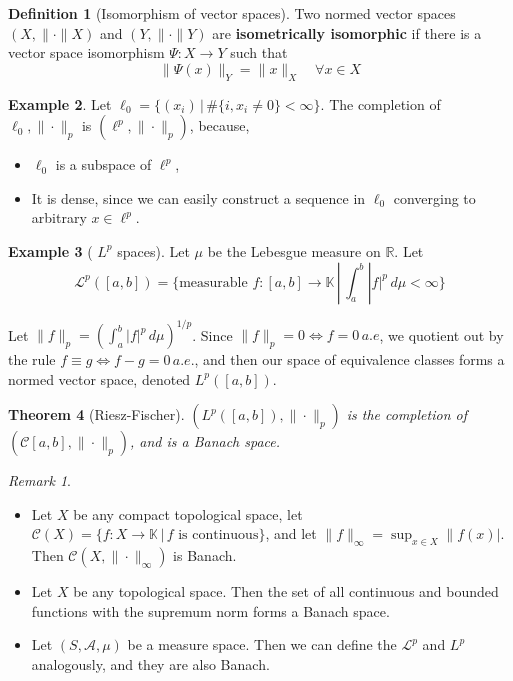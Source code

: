 \documentclass[justified]{tufte-book}
\theoremstyle{plain}%
\newtheorem{thm}{Theorem}[chapter]
\theoremstyle{definition}
\newtheorem{defn}[thm]{Definition}
\newtheorem{exmp}[thm]{Example}
\theoremstyle{remark}
\newtheorem*{rem}{Remark}
\newcommand{\R}{\mathbb{R}}
\newcommand{\K}{\mathbb{K}}
\begin{document}
\begin{defn}[Isomorphism of vector spaces]
  Two normed vector spaces $(X, \| \cdot \|X)$ and $(Y, \| \cdot \|Y)$ are \textbf{isometrically isomorphic} if there is a vector space isomorphism $\Psi: X \rightarrow Y$ such that \[
      \| \Psi(x) \|_Y = \| x \|_X \quad \forall x \in X
  \]
\end{defn}

\begin{exmp}
  Let $\ell_0 = \{ (x_i) \, | \, \# \{ i, x_i \neq 0 \} < \infty \}$.  The completion of $\ell_0, \| \cdot \|_p$ is $(\ell^p, \| \cdot \|_p )$, because,
  \begin{itemize}
      \item $\ell_0$ is a subspace of $\ell^p$,
      \item It is dense, since we can easily construct a sequence in $\ell_0$ converging to arbitrary $x \in \ell^p$.
  \end{itemize}
\end{exmp}
\begin{exmp}[ $L^p$ spaces]
  Let $\mu$ be the Lebesgue measure on $\R$.  Let \[
      \mathcal{L}^p([a,b]) = \{ \text{measurable } f: [a,b] \rightarrow \K \, | \, \int_a^b |f|^p \, d \mu < \infty \}
  \]
  
  Let $\| f \|_p = \left( \int_a^b |f|^p \, d \mu \right)^{1/p}$.  Since $\| f \|_p = 0 \iff f = 0 \, a.e$, we quotient out by the rule $f \equiv g \iff f - g = 0 \, a.e.$, and then our space of equivalence classes forms a normed vector space, denoted $L^p([a,b])$.
\end{exmp}

\begin{thm}[Riesz-Fischer] $(L^p([a,b]), \| \cdot \|_p )$ is the completion of $(\mathcal{C}[a,b],  \| \cdot \|_p )$, and is a Banach space.
\end{thm}

\begin{rem}{\ }
  \begin{itemize}
      \item Let $X$ be any compact topological space, let $\mathcal{C}(X) = \{ f : X \rightarrow \K \, | \, \text{$f$ is continuous} \}$, and let $\|f \|_\infty = \sup_{x \in X} \|f(x)|$.  Then $\mathcal{C}(X, \| \cdot \|_\infty)$ is Banach.  
      \item Let $X$ be any topological space.  Then the set of all continuous and bounded functions with the supremum norm forms a Banach space.
      \item Let $(S, \mathcal{A}, \mu)$ be a measure space.  Then we can define the $\mathcal{L}^p$ and $L^p$ analogously, and they are also Banach.
  \end{itemize}
\end{rem}
\end{document}
